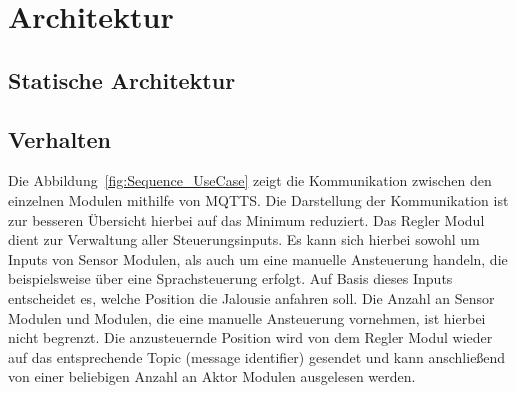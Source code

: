 \chapter{Architektur}
\label{cha:Architektur}

\section{Statische Architektur}

\section{Verhalten}
Die Abbildung~\ref{fig:Sequence_UseCase} zeigt die Kommunikation zwischen den einzelnen Modulen mithilfe von MQTTS. Die Darstellung der Kommunikation ist zur besseren Übersicht hierbei auf das Minimum reduziert. Das Regler Modul dient zur Verwaltung aller Steuerungsinputs. Es kann sich hierbei sowohl um Inputs von Sensor Modulen, als auch um eine manuelle Ansteuerung handeln, die beispielsweise über eine Sprachsteuerung erfolgt. Auf Basis dieses Inputs entscheidet es, welche Position die Jalousie anfahren soll. Die Anzahl an Sensor Modulen und Modulen, die eine manuelle Ansteuerung vornehmen, ist hierbei nicht begrenzt. Die anzusteuernde Position wird von dem Regler Modul wieder auf das entsprechende Topic (message identifier) gesendet und kann anschließend von einer beliebigen Anzahl an Aktor Modulen ausgelesen werden.

